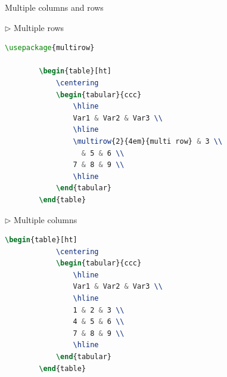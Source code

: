 \documentclass{beamer}
\begin{document}
\begin{frame}[containsverbatim]{Multiple columns and rows}
	\begin{multicols}{2}
		\noindent  
		$\triangleright$ Multiple rows
		\begin{lstlisting}[language=TeX, basicstyle=\tiny]
		\usepackage{multirow}
		
		\begin{table}[ht]
			\centering
			\begin{tabular}{ccc}
				\hline  
				Var1 & Var2 & Var3 \\ 
				\hline
				\multirow{2}{4em}{multi row} & 3 \\
				  & 5 & 6 \\
				7 & 8 & 9 \\
				\hline
			\end{tabular}
		\end{table}   \end{lstlisting}
		
		\columnbreak
		
		$\triangleright$ Multiple columns
		\begin{lstlisting}[language=TeX, basicstyle=\tiny]
		\begin{table}[ht]
			\centering
			\begin{tabular}{ccc}
				\hline 
				Var1 & Var2 & Var3 \\ 
				\hline
				1 & 2 & 3 \\
				4 & 5 & 6 \\
				7 & 8 & 9 \\
				\hline
			\end{tabular}
		\end{table}   \end{lstlisting}
	\end{multicols}
\end{frame}
\end{document}
